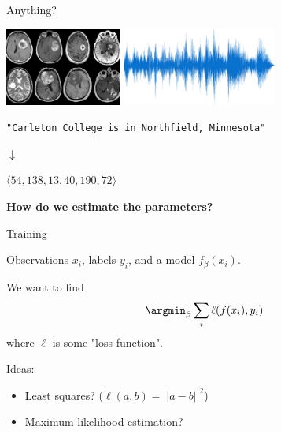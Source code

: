 \begin{frame}{Anything?}

	\qquad \includegraphics[height=1in]{brain-scans.jpg}
	\hfill	\pause
	\qquad \includegraphics[height=1in]{audio-signal.png}

	\pause \bigskip

	\begin{center}
		\texttt{"Carleton College is in Northfield, Minnesota"}

		$\downarrow$

		$\langle 54, 138, 13, 40, 190, 72 \rangle$
	\end{center}

	\pause \bigskip


	\begin{center}
		\textbf{How do we estimate the parameters?}
	\end{center}
\end{frame}

\begin{frame}{Training}

	Observations $x_i$, labels $y_i$, and a model $f_\beta(x_i)$.

	\pause \bigskip

	We want to find
	\begin{equation*}
		\argmin_\beta \sum_i \ell(f(x_i), y_i)
	\end{equation*}
	where $\ell$ is some "loss function".

	\pause \bigskip

	Ideas:

	\begin{itemize}[<+->]
		\item Least squares? ($\ell(a, b) = ||a - b||^2$)
		\item Maximum likelihood estimation?
	\end{itemize}
\end{frame}


